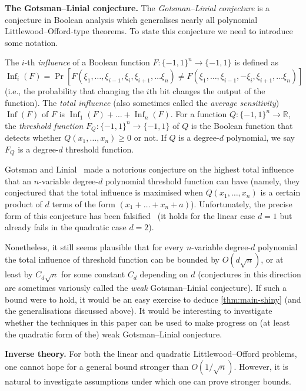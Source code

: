 \documentclass[english]{article}
\theoremstyle{remark}
\numberwithin{equation}{section}
\numberwithin{figure}{section}
\newcommand{\on}{\operatorname}
\begin{document}
\textbf{The Gotsman--Linial conjecture.}
The \emph{Gotsman--Linial conjecture} is a conjecture in Boolean
analysis which generalises nearly all polynomial Littlewood--Offord-type
theorems. To state this conjecture we need to introduce some notation.

The $i$-th\emph{ influence }of a Boolean function $F:\{-1,1\}^{n}\to\{-1,1\}$
is defined as
\[
\on{Inf}_{i}(F)=\Pr[F(\xi_{1},\dots,\xi_{i-1},\xi_{i},\xi_{i+1},\dots\xi_{n})\ne F(\xi_{1},\dots,\xi_{i-1},-\xi_{i},\xi_{i+1},\dots\xi_{n})]
\]
(i.e., the probability that changing the $i$th bit changes the output
of the function). The \emph{total influence} (also sometimes called
the \emph{average sensitivity}) $\on{Inf}(F)$ of $F$ is $\on{Inf}_{1}(F)+\dots+\on{Inf}_{n}(F)$. For a function $Q:\{-1,1\}^n\to \mathbb{R}$, the \emph{threshold function} $F_{Q}:\{-1,1\}^{n}\to\{-1,1\}$ of
$Q$ is the Boolean function that detects whether $Q(x_{1},\dots,x_{n})\ge0$
or not. If $Q$ is a degree-$d$ polynomial, we say $F_{Q}$ is a
degree-$d$ threshold function.

Gotsman and Linial~\cite{GL94} made a notorious conjecture on the highest
total influence that an $n$-variable degree-$d$ polynomial threshold
function can have (namely, they conjectured that the total influence
is maximised when $Q(x_{1},\dots,x_{n})$ is a certain product of $d$ terms
of the form $(x_{1}+\dots+x_{n}+a)$). Unfortunately, the precise
form of this conjecture has been falsified~\cite{Cha18,KMW} (it holds
for the linear case $d=1$ but already fails in the quadratic case
$d=2$).

Nonetheless, it still seems plausible that for every $n$-variable degree-$d$
polynomial the total influence of threshold function can be bounded by $O(d\sqrt{n})$,
or at least by $C_{d}\sqrt{n}$ for some constant $C_{d}$ depending on $d$
(conjectures in this direction are sometimes variously called the
\emph{weak} Gotsman--Linial conjecture). If such a bound were to
hold, it would be an easy exercise to deduce \cref{thm:main-shiny} (and the generalisations
discussed above). It would be interesting to investigate whether the techniques in this paper can be used to make progress on (at least the quadratic form of the) weak Gotsman--Linial conjecture.

\textbf{Inverse theory.} For both the linear and quadratic Littlewood--Offord problems, one
cannot hope for a general bound stronger than $O(1/\sqrt{n})$. However,
it is natural to investigate assumptions under which one can prove
stronger bounds.
\end{document}
